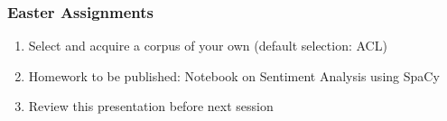 \documentclass{beamer}
\begin{document}
\begin{frame}

    \frametitle{Easter Assignments}

	\begin{enumerate}
  
    	\item Select and acquire a corpus of your own (default selection: ACL)
    	\item Homework to be published: Notebook on Sentiment Analysis using SpaCy
    	\item Review this presentation before next session
    \end{enumerate}

\end{frame}
\end{document}
